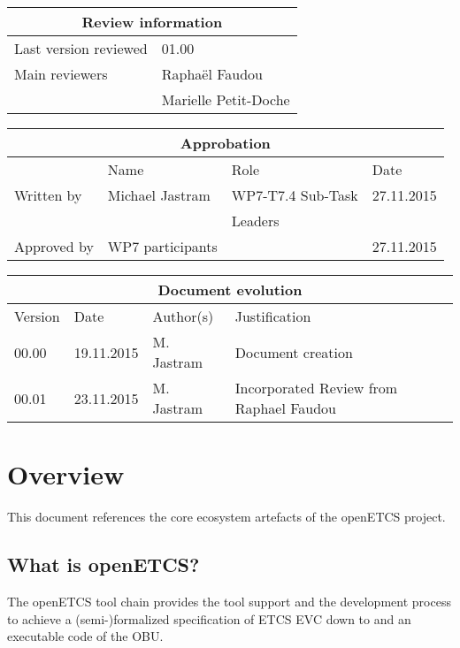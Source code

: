 \documentclass{template/openetcs_report}
\begin{document}
\begin{tabular}{|p{4.4cm}|p{8.7cm}|}
\hline
\multicolumn{2}{|c|}{Review information} \\
\hline
Last version reviewed & 01.00 \\
\hline
Main reviewers & Raphaël Faudou \\
& Marielle Petit-Doche \\
\hline
\end{tabular}

\begin{tabular}{|p{2.2cm}|p{4cm}|p{4cm}|p{2cm}|}
\hline
\multicolumn{4}{|c|}{Approbation} \\
\hline
  &  Name & Role & Date   \\
\hline  
Written by    &  Michael Jastram & WP7-T7.4 Sub-Task  & 27.11.2015 \\
&  & Leaders&\\
\hline
Approved by & WP7 participants &   & 27.11.2015 \\
\hline
\end{tabular}

\begin{tabular}{|p{2.2cm}|p{2cm}|p{3cm}|p{5cm}|}
\hline
\multicolumn{4}{|c|}{Document evolution} \\
\hline
Version &  Date & Author(s) & Justification  \\
\hline  
00.00 & 19.11.2015 & M. Jastram  &  Document creation  \\
00.01 & 23.11.2015 & M. Jastram  &  Incorporated Review from Raphael Faudou  \\


\hline  
\end{tabular}
\newpage


\mainmatter
\chapter{Overview}

This document references the core ecosystem artefacts of the openETCS project.

\section{What is openETCS?}

The openETCS tool chain provides the tool support and the development process to achieve a (semi-)formalized
specification of ETCS EVC down to and an executable code of the
OBU.
\end{document}
